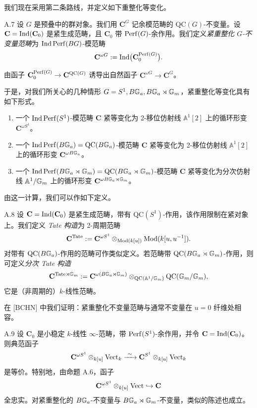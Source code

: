 我们现在采用第二条路线，并定义如下重整化等变化。

\begin{defn}{A.7}\label{defn:a5-04-1}
设 $G$ 是预叠中的群对象。我们用 $\mathbf C^G$ 记余模范畴的 $\mathrm{QC}(G)$-不变量。设 $\mathbf C=\operatorname{Ind}(\mathbf C_0)$ 是紧生成范畴，且 $\mathbf C_0$ 带 $\operatorname{Perf}(G)$-余作用。我们定义\emph{紧重整化 $G$-不变量范畴}为 $\operatorname{Ind}\operatorname{Perf}(BG)$-模范畴
\[
\mathbf C^{\omega G}:=\operatorname{Ind}\bigl(\mathbf C_0^{\operatorname{Perf}(G)}\bigr).
\]
\end{defn}

由函子 $\mathbf C_0^{\operatorname{Perf}(G)}\to\mathbf C^{\mathrm{QC}(G)}$ 诱导出自然函子 $\mathbf C^{\omega G}\to\mathbf C^{G}$。


于是，对我们所关心的几种情形 $G=S^1,B\mathbb{G}_a,B\mathbb{G}_a\rtimes\mathbb{G}_m$，紧重整化等变化具有如下形式。
\begin{enumerate}[(1)]
\item 一个 $\operatorname{Ind}\operatorname{Perf}(S^1)$-模范畴 $\mathbf C$ 紧等变化为 2-移位仿射线 $\mathbb A^1[2]$ 上的循环形变 $\mathbf C^{\omega S^1}$。
\item 一个 $\operatorname{Ind}\operatorname{Perf}(B\mathbb{G}_a)=\mathrm{QC}(B\mathbb{G}_a)$-模范畴 $\mathbf C$ 紧等变化为 2-移位仿射线 $\mathbb A^1[2]$ 上的循环形变 $\mathbf C^{\omega B\mathbb{G}_a}$。
\item 一个 $\operatorname{Ind}\operatorname{Perf}(B\mathbb{G}_a\rtimes\mathbb{G}_m)=\mathrm{QC}(B\mathbb{G}_a\rtimes\mathbb{G}_m)$-模范畴 $\mathbf C$ 紧等变化为分次仿射线 $\mathbb A^1/\mathbb{G}_m$ 上的循环形变 $\mathbf C^{\omega B\mathbb{G}_a\rtimes\mathbb{G}_m}$。
\end{enumerate}

由这一计算，我们可以作如下定义。

\begin{defn}{A.8}\label{defn:a5-04-2}
设 $\mathbf C=\operatorname{Ind}(\mathbf C_0)$ 是紧生成范畴，带有 $\mathrm{QC}(S^1)$-作用，该作用限制在紧对象上。我们定义 \emph{Tate 构造}为 2-周期范畴
\[
\mathbf C^{\mathrm{Tate}}:=\mathbf C^{\omega S^1}\otimes_{\operatorname{Mod}(k[u])}\operatorname{Mod}(k[u,u^{-1}]).
\]
对带有 $\mathrm{QC}(B\mathbb{G}_a)$-作用的范畴可作类似定义。若范畴带 $\mathrm{QC}(B\mathbb{G}_a\rtimes\mathbb{G}_m)$-作用，则可定义\emph{分次 Tate 构造}
\[
\mathbf C^{\mathrm{Tate}\rtimes\mathbb{G}_m}:=\mathbf C^{\omega(B\mathbb{G}_a\rtimes\mathbb{G}_m)}\otimes_{\mathrm{QC}(\mathbb A^1/\mathbb{G}_m)}\mathrm{QC}(\mathbb{G}_m/\mathbb{G}_m),
\]
它是（非周期的）$k$-线性范畴。
\end{defn}

在 [BCHN] 中我们证明：紧重整化不变量范畴与通常不变量在 $u=0$ 纤维处相容。

\begin{prop}{A.9}\label{prop:a5-04-3}
设 $\mathbf C_0$ 是小稳定 $k$-线性 $\infty$-范畴，带 $\operatorname{Perf}(S^1)$-余作用，并令 $\mathbf C=\operatorname{Ind}(\mathbf C_0)$。则典范函子
\[
\mathbf C^{\omega S^1}\otimes_{k[u]}\mathrm{Vect}_k\xrightarrow{\ \sim\ }\mathbf C^{S^1}\otimes_{k[u]}\mathrm{Vect}_k
\]
是等价。特别地，由命题 A.6，函子
\[
\mathbf C^{\omega S^1}\otimes_{k[u]}\mathrm{Vect}\hookrightarrow\mathbf C
\]
全忠实。对紧重整化的 $B\mathbb{G}_a$-不变量与 $B\mathbb{G}_a\rtimes\mathbb{G}_m$-不变量，类似的陈述也成立。
\end{prop}

